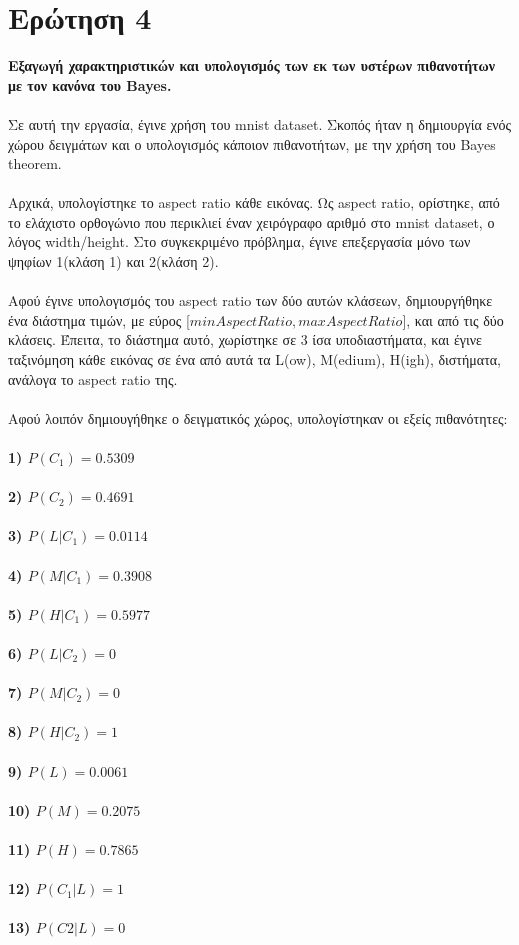 \documentclass[12pt]{article}
\begin{document}
\section*{Ερώτηση 4}
{\bfseries  Εξαγωγή χαρακτηριστικών και υπολογισμός των εκ των υστέρων
πιθανοτήτων με τον κανόνα του Bayes.}\\\\
Σε αυτή την εργασία, έγινε χρήση του mnist dataset. Σκοπός ήταν η δημιουργία ενός χώρου δειγμάτων και ο υπολογισμός κάποιον πιθανοτήτων, με την χρήση του Bayes theorem.\\\\
Αρχικά, υπολογίστηκε το aspect ratio κάθε εικόνας. Ως aspect ratio, ορίστηκε, από το ελάχιστο ορθογώνιο που περικλιεί έναν χειρόγραφο αριθμό στο mnist dataset, ο λόγος width/height. Στο συγκεκριμένο πρόβλημα, έγινε επεξεργασία μόνο των ψηφίων 1(κλάση 1) και 2(κλάση 2).\\\\
Αφού έγινε υπολογισμός του aspect ratio των δύο αυτών κλάσεων, δημιουργήθηκε ένα διάστημα τιμών, με εύρος [$minAspectRatio , maxAspectRatio$], και από τις δύο κλάσεις. Έπειτα, το διάστημα αυτό, χωρίστηκε σε 3 ίσα υποδιαστήματα, και έγινε ταξινόμηση κάθε εικόνας σε ένα από αυτά τα L(ow), M(edium), H(igh), διστήματα, ανάλογα το aspect ratio της.\\\\
Αφού λοιπόν δημιουγήθηκε ο δειγματικός χώρος, υπολογίστηκαν οι εξείς πιθανότητες:\\\\
{\bfseries 1) \(P(C_1) = 0.5309\) \\\\
2) \(P(C_2) = 0.4691\) \\\\
3) \(P(L|C_1) = 0.0114\)\\\\
4) \(P(M|C_1) = 0.3908\)\\\\
5) \(P(H|C_1) = 0.5977\)\\\\
6) \(P(L|C_2) = 0\) \\\\
7) \(P(M|C_2) = 0\) \\\\
8) \(P(H|C_2) = 1\) \\\\
9) \(P(L) = 0.0061\) \\\\
10) \(P(M) = 0.2075\) \\\\
11) \(P(H) = 0.7865\) \\\\
12) \(P(C_1|L) = 1\) \\\\
13) \(P(C2|L) = 0\)}
\end{document}
